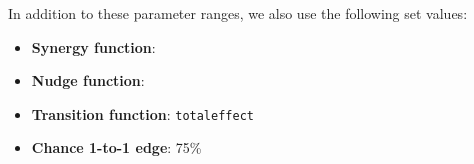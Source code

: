 \documentclass[../main.tex]{subfiles}
\begin{document}
In addition to these parameter ranges, we also use the following set values:

\begin{itemize}
\item \textbf{Synergy function}: \texttt{}
\item \textbf{Nudge function}: \texttt{}
\item \textbf{Transition function}: \texttt{totaleffect}
\item \textbf{Chance 1-to-1 edge}: 75\% 
\end{itemize}
\end{document}
